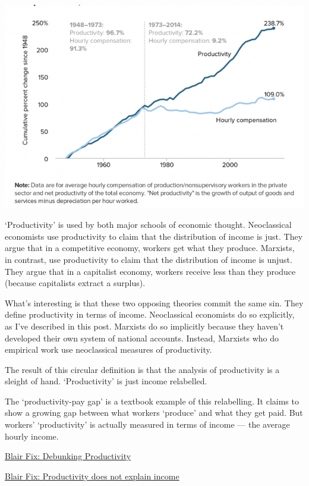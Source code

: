 \documentclass[
]{book}
\begin{document}
\includegraphics{fig/productivity_pay_gap.png}

`Productivity' is used by both major schools of economic thought. Neoclassical economists use productivity to claim that the distribution of income is just. They argue that in a competitive economy, workers get what they produce. Marxists, in contrast, use productivity to claim that the distribution of income is unjust. They argue that in a capitalist economy, workers receive less than they produce (because capitalists extract a surplus).

What's interesting is that these two opposing theories commit the same sin. They define productivity in terms of income. Neoclassical economists do so explicitly, as I've described in this post. Marxists do so implicitly because they haven't developed their own system of national accounts. Instead, Marxists who do empirical work use neoclassical measures of productivity.

The result of this circular definition is that the analysis of productivity is a sleight of hand. `Productivity' is just income relabelled.

The `productivity-pay gap' is a textbook example of this relabelling. It claims to show a growing gap between what workers `produce' and what they get paid. But workers' `productivity' is actually measured in terms of income --- the average hourly income.

\href{https://economicsfromthetopdown.com/2020/01/17/debunking-the-productivity-pay-gap/amp/}{Blair Fix: Debunking Productivity}

\href{https://evonomics.com/no-productivity-does-not-explain-income/}{Blair Fix: Productivity does not explain income}
\end{document}
